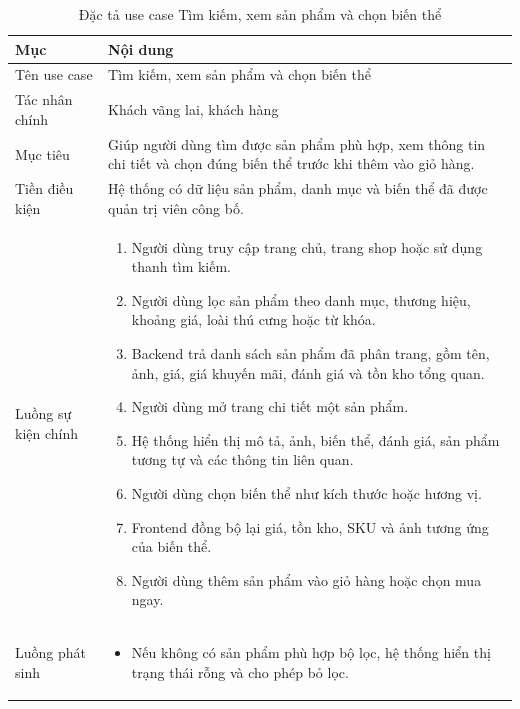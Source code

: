 \documentclass[../DoAn.tex]{subfiles}
\begin{document}
{\normalsize
\setlength{\LTleft}{\fill}
\setlength{\LTright}{\fill}
\setlength{\tabcolsep}{5pt}
\renewcommand{\arraystretch}{1.25}
\begin{longtable}{|p{3.2cm}|p{10.4cm}|}
\caption{Đặc tả use case Tìm kiếm, xem sản phẩm và chọn biến thể}
\label{table:2.5}\\
\hline
\textbf{Mục} & \textbf{Nội dung} \\ \hline
Tên use case & Tìm kiếm, xem sản phẩm và chọn biến thể \\ \hline
Tác nhân chính & Khách vãng lai, khách hàng \\ \hline
Mục tiêu & Giúp người dùng tìm được sản phẩm phù hợp, xem thông tin chi tiết và chọn đúng biến thể trước khi thêm vào giỏ hàng. \\ \hline
Tiền điều kiện & Hệ thống có dữ liệu sản phẩm, danh mục và biến thể đã được quản trị viên công bố. \\ \hline
Luồng sự kiện chính &
\begin{minipage}[t]{10.1cm}
\begin{enumerate}[leftmargin=*,topsep=0pt,itemsep=0pt]
    \item Người dùng truy cập trang chủ, trang shop hoặc sử dụng thanh tìm kiếm.
    \item Người dùng lọc sản phẩm theo danh mục, thương hiệu, khoảng giá, loài thú cưng hoặc từ khóa.
    \item Backend trả danh sách sản phẩm đã phân trang, gồm tên, ảnh, giá, giá khuyến mãi, đánh giá và tồn kho tổng quan.
    \item Người dùng mở trang chi tiết một sản phẩm.
    \item Hệ thống hiển thị mô tả, ảnh, biến thể, đánh giá, sản phẩm tương tự và các thông tin liên quan.
    \item Người dùng chọn biến thể như kích thước hoặc hương vị.
    \item Frontend đồng bộ lại giá, tồn kho, SKU và ảnh tương ứng của biến thể.
    \item Người dùng thêm sản phẩm vào giỏ hàng hoặc chọn mua ngay.
\end{enumerate}
\end{minipage} \\ \hline
Luồng phát sinh &
\begin{minipage}[t]{10.1cm}
\begin{itemize}[leftmargin=*,topsep=0pt,itemsep=0pt]
    \item Nếu không có sản phẩm phù hợp bộ lọc, hệ thống hiển thị trạng thái rỗng và cho phép bỏ lọc.

\end{itemize}
\end{minipage}
\end{longtable}}
\end{document}
